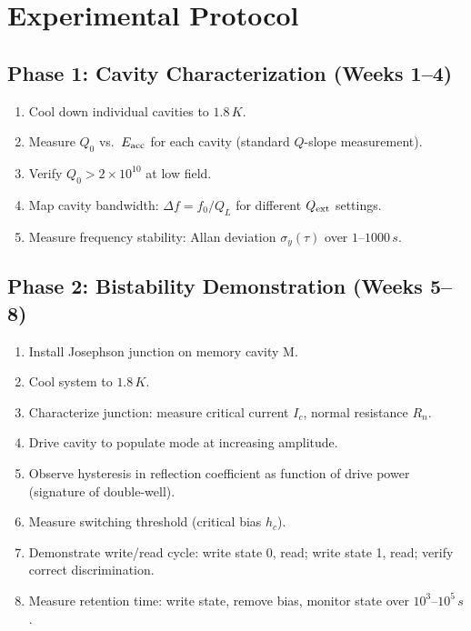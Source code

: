 \documentclass[12pt,a4paper]{article}
\begin{document}
\section{Experimental Protocol}

\subsection{Phase 1: Cavity Characterization (Weeks 1--4)}

\begin{enumerate}
\item Cool down individual cavities to $1.8\,\si{K}$.
\item Measure $Q_0$ vs.\ $E_{\rm acc}$ for each cavity (standard $Q$-slope measurement).
\item Verify $Q_0 > 2 \times 10^{10}$ at low field.
\item Map cavity bandwidth: $\Delta f = f_0/Q_L$ for different $Q_{\rm ext}$ settings.
\item Measure frequency stability: Allan deviation $\sigma_y(\tau)$ over $1$--$1000\,\si{s}$.
\end{enumerate}

\subsection{Phase 2: Bistability Demonstration (Weeks 5--8)}

\begin{enumerate}
\item Install Josephson junction on memory cavity M.
\item Cool system to $1.8\,\si{K}$.
\item Characterize junction: measure critical current $I_c$, normal resistance $R_n$.
\item Drive cavity to populate mode at increasing amplitude.
\item Observe hysteresis in reflection coefficient as function of drive power (signature of double-well).
\item Measure switching threshold (critical bias $h_c$).
\item Demonstrate write/read cycle: write state 0, read; write state 1, read; verify correct discrimination.
\item Measure retention time: write state, remove bias, monitor state over $10^3$--$10^5\,\si{s}$.
\end{enumerate}
\end{document}
